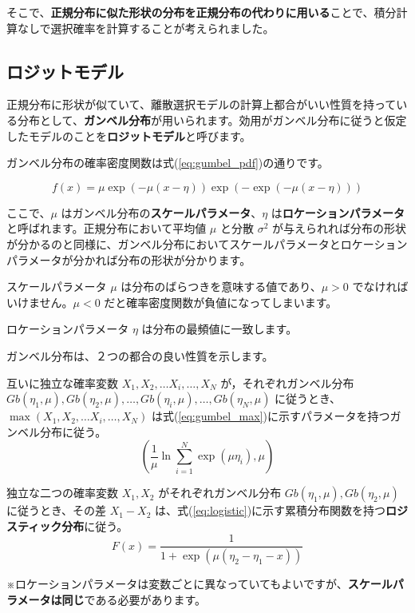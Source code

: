 そこで、\textbf{正規分布に似た形状の分布を正規分布の代わりに用いる}ことで、積分計算なしで選択確率を計算することが考えられました。

\subsection{ロジットモデル}\label{ssec:logit}

正規分布に形状が似ていて、離散選択モデルの計算上都合がいい性質を持っている分布として、\textbf{ガンベル分布}が用いられます。効用がガンベル分布に従うと仮定したモデルのことを\textbf{ロジットモデル}と呼びます。

ガンベル分布の確率密度関数は式(\ref{eq:gumbel_pdf})の通りです。

\begin{equation}
    \label{eq:gumbel_pdf}
    f(x) = \mu \exp(-\mu (x-\eta)) \exp(-\exp(-\mu (x-\eta)))
\end{equation}

ここで、$\mu$ はガンベル分布の\textbf{スケールパラメータ}、$\eta$ は\textbf{ロケーションパラメータ}と呼ばれます。正規分布において平均値 $\mu$ と分散 $\sigma^2$ が与えられれば分布の形状が分かるのと同様に、ガンベル分布においてスケールパラメータとロケーションパラメータが分かれば分布の形状が分かります。

スケールパラメータ $\mu$ は分布のばらつきを意味する値であり、$\mu>0$ でなければいけません。$\mu<0$ だと確率密度関数が負値になってしまいます。

ロケーションパラメータ $\eta$ は分布の最頻値に一致します。

ガンベル分布は、２つの都合の良い性質を示します。

\begin{theorem}
    \label{it:gumbel_max}
    互いに独立な確率変数 $X_1,X_2, \ldots X_i, \ldots, X_N$ が，それぞれガンベル分布\mbox{}\\ $Gb(\eta_1, \mu), Gb(\eta_2, \mu),\ldots,Gb(\eta_i, \mu),\ldots,Gb(\eta_N, \mu)$ に従うとき、$\max(X_1,X_2, \ldots X_i, \ldots, X_N)$ は式(\ref{eq:gumbel_max})に示すパラメータを持つガンベル分布に従う。
    \begin{equation}
        \label{eq:gumbel_max}
        \left(\frac{1}{\mu} \ln\sum_{i=1}^N \exp(\mu\eta_i), \mu\right)
    \end{equation}
\end{theorem}

\begin{theorem}

    \label{it:logistic}
    独立な二つの確率変数 $X_1,X_2$ がそれぞれガンベル分布 $Gb(\eta_1, \mu), Gb(\eta_2, \mu)$ に従うとき、その差 $X_1-X_2$ は、式(\ref{eq:logistic})に示す累積分布関数を持つ\textbf{ロジスティック分布}に従う。
    \begin{equation}
        \label{eq:logistic}
        F(x)=\frac{1}{1+\exp(\mu(\eta_2-\eta_1-x))}
    \end{equation}

    ※ロケーションパラメータは変数ごとに異なっていてもよいですが、\textbf{スケールパラメータは同じ}である必要があります。
\end{theorem}

